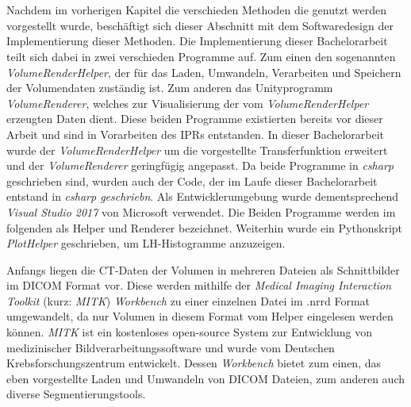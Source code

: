 \chapter{}
\label{sec:concept}


Nachdem im vorherigen Kapitel die verschieden Methoden die genutzt werden vorgestellt wurde, beschäftigt sich dieser Abschnitt mit dem Softwaredesign der Implementierung dieser Methoden.
\newline
Die Implementierung dieser Bachelorarbeit teilt sich dabei in zwei verschieden Programme auf. Zum einen den sogenannten \textit{VolumeRenderHelper}, der für das Laden, Umwandeln, Verarbeiten und Speichern der Volumendaten zuständig ist. Zum anderen das Unityprogramm \textit{VolumeRenderer}, welches zur Visualisierung der vom \textit{VolumeRenderHelper} erzeugten Daten dient. Diese beiden Programme existierten bereits vor dieser Arbeit und sind in Vorarbeiten des IPRs entstanden.
\newline
In dieser Bachelorarbeit wurde der \textit{VolumeRenderHelper} um die vorgestellte Transferfunktion erweitert und der \textit{VolumeRenderer} geringfügig angepasst. Da beide Programme in \textit{csharp} geschrieben sind, wurden auch der Code, der im Laufe dieser Bachelorarbeit entstand in \textit{csharp geschriebn}. Als Entwicklerumgebung wurde dementsprechend \textit{Visual Studio 2017} von Microsoft verwendet.
\newline
Die Beiden Programme werden im folgenden als Helper und Renderer bezeichnet. Weiterhin wurde ein Pythonskript \textit{PlotHelper} geschrieben, um LH-Histogramme anzuzeigen.


Anfangs liegen die CT-Daten der Volumen in mehreren Dateien als Schnittbilder im DICOM Format vor. Diese werden mithilfe der \textit{Medical Imaging Interaction Toolkit} (kurz: \textit{MITK}) \textit{Workbench} \cite{mitk} zu einer einzelnen Datei im .nrrd Format umgewandelt, da nur Volumen in diesem Format vom Helper eingelesen werden können.
\newline
\textit{MITK} ist ein kostenloses open-source System zur Entwicklung von medizinischer Bildverarbeitungssoftware und wurde vom Deutschen Krebsforschungszentrum entwickelt. Dessen \textit{Workbench} bietet zum einen, das eben vorgestellte Laden und Umwandeln von DICOM Dateien, zum anderen auch diverse Segmentierungstools.


